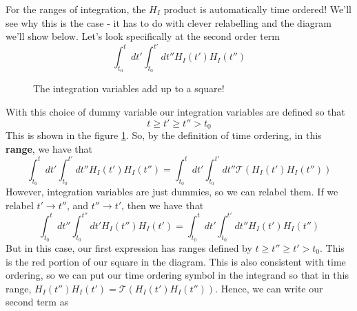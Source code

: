 For the ranges of integration, the $ H_I $ product is automatically time ordered! 
We'll see why this is the case - it has to do with clever relabelling and the diagram we'll show below. 
Let's look specifically at the second order term 
\[
\int_{ t_0 } ^ t dt' \int_{ t_0 } ^{ t' } dt'' H_{ I } ( t' ) H_{ I } ( t'' ) 
\]
\begin{figure}[h]
\centering 
{}
\caption{The integration variables add up to a square!} 
\label{fig:intAdd}
\end{figure}

With this choice of dummy variable our integration variables
are defined so that 
\[
t \ge t' \ge  t'' > t_0 
\] This is shown in the figure \ref{fig:intAdd}. 
So, by the definition of time ordering, in this \textbf{range}, 
we have that 
\[
\int_{ t_0 } ^ t dt' \int_{ t_0 } ^{ t' } dt'' H_{ I } ( t' ) H_{ I } ( t'' ) = \int_{ t_0 } ^ t dt' \int_{ t_0 } ^{ t' } dt'' \mathcal{ T } ( H_{ I } ( t' ) H_{ I } ( t'' ) ) \] However, integration variables are just dummies, so 
we can relabel them. If we relabel $ t' \to t''$, and 
$ t'' \to  t' $, then we have that 
\[
\int_{ t_0 } ^ t dt'' \int_{ t_0 } ^{ t'' } dt' H_{ I } ( t'' ) H_{ I } ( t' )  = \int_{ t_0 } ^ t dt' \int_{ t_0 } ^{ t' } dt'' H_{ I } ( t' ) H_{ I } ( t'' ) 
\] But in this case, our first expression has ranges defined by $ t \geq t'' \geq t' > t_0 $. 
This is the red portion of our square in 
the diagram. 
This is also consistent with time ordering, so we can put our time ordering symbol in the integrand 
so that in this range, $ H_{ I } (t'') H_{ I  }  ( t' ) = \mathcal{ T } ( H _I ( t' ) H _ I ( t'' ) ) $.  
Hence, we can write our second term as 

